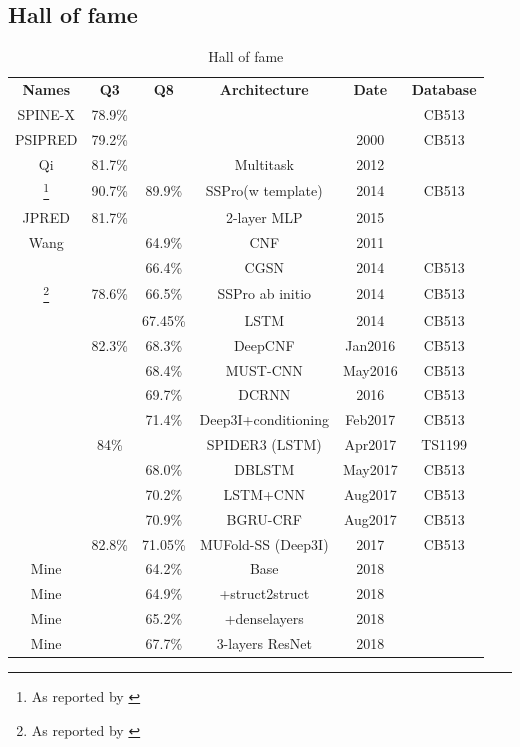 \documentclass[]{scrartcl}
\begin{document}
\subsection{Hall of fame}
\begin{table}[h]
	\begin{tabular}{cccccc}
		\textbf{Names} & \textbf{Q3} & \textbf{Q8} & \textbf{Architecture} & \textbf{Date} & \textbf{Database} \\
		SPINE-X & 78.9\% & & & & CB513 \\
		PSIPRED & 79.2\% & & & 2000 & CB513 \\ 
		Qi		& 81.7\% &  & Multitask & 2012 &  \\ 
		\cite{Magnan2014}\footnote{As reported by \cite{Wang2016}}			& 		  90.7\% & 89.9\%	& SSPro(w template) & 2014 & CB513 \\
		JPRED 	& 81.7\% &  & 2-layer MLP & 2015 &  \\ \hline
		
		Wang 			&  	& 64.9\% 	& CNF 			& 2011 	&  \\ 
		\cite{Zhou2014}	&  	& 66.4\% 	& CGSN 			& 2014 	& CB513 \\ 
		\cite{Magnan2014}\footnote{As reported by \cite{Fang2017}} 			& 				78.6\% & 66.5\% & SSPro ab initio & 2014 & CB513\\
		\cite{Sønderby2014}	&  	& 67.45\% 	& LSTM 			& 2014 	& CB513 \\ 
		\cite{Wang2016} & 82.3\% & 68.3\% & DeepCNF 	& Jan2016 & CB513\\ 
		\cite{Lin2016} 	&  	& 68.4\% 	& MUST-CNN 		& May2016 & CB513 \\
		\cite{Li2016}	&  	& 69.7\% 	& DCRNN 		& 2016 	& CB513 \\
		\cite{Busia2017}&	& 71.4\%& Deep3I+conditioning& Feb2017 & CB513\\
		\cite{Heffernan2017} &84\% &  & SPIDER3 (LSTM) & Apr2017 & TS1199 \\
		\cite{Hattori2017} & & 68.0\%	& DBLSTM		& May2017 & CB513 \\
		\cite{Jurtz2017} &  & 70.2\%	& LSTM+CNN 		& Aug2017 & CB513 \\
		\cite{Johansen2017} & & 70.9\% & BGRU-CRF & Aug2017 & CB513\\
		\cite{Fang2017}&82.8\%& 71.05\% & MUFold-SS (Deep3I)&2017& CB513 \\
		\hline 
	
		Mine 	&  & 64.2\% & Base & 2018 &  \\ 
		Mine 	&  & 64.9\% & +struct2struct & 2018 &  \\ 
		Mine 	&  & 65.2\% & +denselayers & 2018 &  \\ 
		Mine 	&  & 67.7\% & 3-layers ResNet & 2018 &  \\ 
	\end{tabular}
	\caption{Hall of fame}
\end{table}
\end{document}
